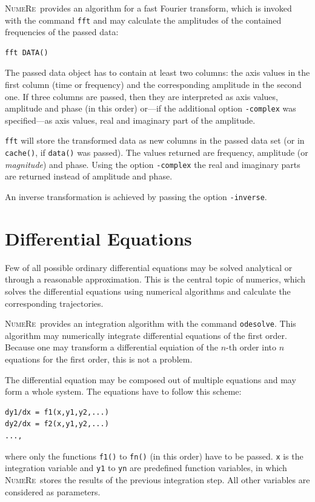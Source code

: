 \documentclass[DIV=14,headsepline,footsepline]{scrbook}
\newcommand{\NR}{\textsc{Nu\-me\-Re}}
\begin{document}
				\NR\ provides an algorithm for a fast Fourier transform, which is invoked with the command \lstinline+fft+ and may calculate the amplitudes of the contained frequencies of the passed data:
				\begin{lstlisting}
fft DATA()
				\end{lstlisting}
				The passed data object has to contain at least two columns: the axis values in the first column (time or frequency) and the corresponding amplitude in the second one. If three columns are passed, then they are interpreted as axis values, amplitude and phase (in this order) or---if the additional option \lstinline+-complex+ was specified---as axis values, real and imaginary part of the amplitude.
				
				\lstinline+fft+ will store the transformed data as new columns in the passed data set (or in \lstinline+cache()+, if \lstinline+data()+ was passed). The values returned are frequency, amplitude (or \emph{magnitude}) and phase. Using the option \lstinline+-complex+ the real and imaginary parts are returned instead of amplitude and phase.
				
				An inverse transformation is achieved by passing the option \lstinline+-inverse+.
				
			\section{Differential Equations}
				Few of all possible ordinary differential equations may be solved analytical or through a reasonable approximation. This is the central topic of numerics, which solves the differential equations using numerical algorithms and calculate the corresponding trajectories.
				
				\NR\ provides an integration algorithm with the command \lstinline+odesolve+. This algorithm may numerically integrate differential equations of the first order. Because one may transform a differential equiation of the $n$-th order into $n$ equations for the first order, this is not a problem.
				
				The differential equation may be composed out of multiple equations and may form a whole system. The equations have to follow this scheme:
				\begin{lstlisting}
dy1/dx = f1(x,y1,y2,...)
dy2/dx = f2(x,y1,y2,...)
...,				
				\end{lstlisting}
				where only the functions \lstinline+f1()+ to \lstinline+fn()+ (in this order) have to be passed. \lstinline+x+ is the integration variable and \lstinline+y1+ to \lstinline+yn+ are predefined function variables, in which \NR\ stores the results of the previous integration step. All other variables are considered as parameters.
	
\end{document}
